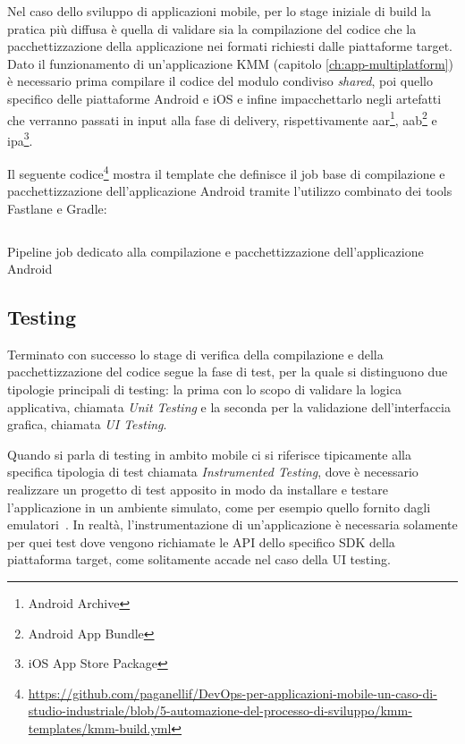 Nel caso dello sviluppo di applicazioni mobile, 
per lo stage iniziale di build la pratica più diffusa è quella di validare sia la compilazione del codice che la pacchettizzazione della applicazione nei formati richiesti dalle piattaforme target. 
Dato il funzionamento di un'applicazione KMM (capitolo \ref{ch:app-multiplatform}) è necessario prima compilare il codice del modulo condiviso \textit{shared}, 
poi quello specifico delle piattaforme Android e iOS e infine impacchettarlo negli artefatti che verranno passati in input alla fase di delivery, 
rispettivamente aar\footnote{Android Archive}, 
aab\footnote{Android App Bundle} e ipa\footnote{iOS App Store Package}.

Il seguente codice\footnote{\href{https://github.com/paganellif/DevOps-per-applicazioni-mobile-un-caso-di-studio-industriale/blob/5-automazione-del-processo-di-sviluppo/kmm-templates/kmm-build.yml}{https://github.com/paganellif/DevOps-per-applicazioni-mobile-un-caso-di-studio-industriale/blob/5-automazione-del-processo-di-sviluppo/kmm-templates/kmm-build.yml}} mostra il template che definisce il job base di compilazione e pacchettizzazione dell'applicazione Android tramite l'utilizzo combinato dei tools Fastlane e Gradle:

\begin{listing}[H]
    \inputminted{yaml}{code/build-job.yaml}
    \caption{Pipeline job dedicato alla compilazione e pacchettizzazione dell'applicazione Android}
\end{listing}

\subsection{Testing}
Terminato con successo lo stage di verifica della compilazione e della pacchettizzazione del codice segue la fase di test,
per la quale si distinguono due tipologie principali di testing: 
la prima con lo scopo di validare la logica applicativa, 
chiamata \textit{Unit Testing} e la seconda per la validazione dell'interfaccia grafica, 
chiamata \textit{UI Testing}.

Quando si parla di testing in ambito mobile ci si riferisce tipicamente alla specifica tipologia di test chiamata \textit{Instrumented Testing}, 
dove è necessario realizzare un progetto di test apposito 
in modo da installare e testare l'applicazione in un ambiente simulato,
come per esempio quello fornito dagli emulatori~\cite{darwin2011android}. 
In realtà,
l'instrumentazione di un'applicazione è necessaria solamente per quei test dove vengono richiamate le API dello specifico SDK della piattaforma target, 
come solitamente accade nel caso della UI testing.


